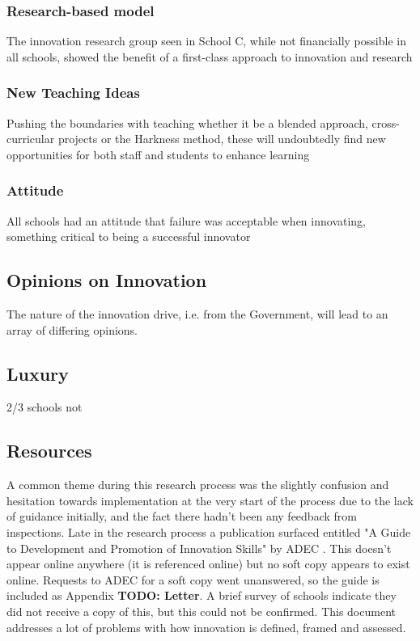 \subsubsection{Research-based model}
The innovation research group seen in School C, while not financially possible in all schools, 
showed the benefit of a first-class approach to innovation and research

\subsubsection{New Teaching Ideas}
Pushing the boundaries with teaching whether it be a blended approach, cross-curricular projects or the Harkness method, these will undoubtedly find new opportunities for both staff and students to enhance learning 

\subsubsection{Attitude}
All schools had an attitude that failure was acceptable when innovating, something critical to being a successful innovator 

\subsection{Opinions on Innovation}

The nature of the innovation drive, i.e. from the Government, will lead to an array of differing opinions.

\subsection{Luxury}
2/3 schools not \cite{ADEC2016 pi.3}

\subsection{Resources}
A common theme during this research process was the slightly confusion and hesitation towards implementation at the very start of the process due to the lack of guidance initially, and the fact there hadn't been any feedback from inspections. Late in the research process a publication surfaced entitled "A Guide to Development and Promotion of Innovation Skills" by ADEC \citet{ADEC2015a}. This doesn't appear online anywhere (it is referenced online) but no soft copy appears to exist online. Requests to ADEC for a soft copy went unanswered, so the guide is included as Appendix \textbf{TODO: Letter}. A brief survey of schools indicate they did not receive a copy of this, but this could not be confirmed. This document addresses a lot of problems with how innovation is defined, framed and assessed.

